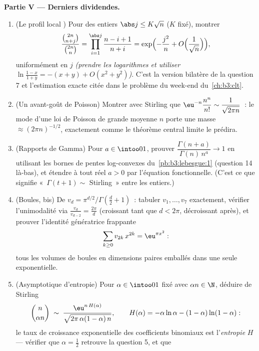 \begin{problem}
\medskip
\noindent\textbf{Partie V --- Derniers dividendes.}
\begin{enumerate}[resume]
  \item (Le profil local ) Pour des entiers $\abs j
        \leq K\sqrt n$ ($K$ fixé), montrer
        \[
        \frac{\binom{2n}{n+j}}{\binom{2n}{n}} =
        \prod_{i=1}^{\abs j}\frac{n - i + 1}{n + i}
        = \exp\Bigl(-\frac{j^2}n +
        O\Bigl(\frac1{\sqrt n}\Bigr)\Bigr),
        \]
        uniformément en $j$ \emph{(prendre les logarithmes et
        utiliser $\ln \frac{1-x}{1+y} = -(x + y) + O(x^2 +
        y^2)$)}. C'est la version bilatère de la question 7
        et l'estimation exacte citée dans le problème du
        week-end du~\cref{ch:b3:clt}.
  \item (Un avant-goût de Poisson) Montrer avec Stirling que
        $\eu^{-n}\dfrac{n^n}{n!} \sim \dfrac1{\sqrt{2\pi
        n}}$~: le mode d'une loi de Poisson de grande
        moyenne $n$ porte une masse $\approx (2\pi
        n)^{-1/2}$, exactement comme le théorème central
        limite le prédira.
  \item (Rapports de Gamma) Pour $a \in \intoo01$, prouver
        $\dfrac{\Gamma(n + a)}{\Gamma(n)\,n^a} \to 1$ en
        utilisant les bornes de pentes log-convexes
        du~\cref{pb:b3:lebesgue:1} (question 14 là-bas), et
        étendre à tout réel $a > 0$ par l'équation
        fonctionnelle. (C'est ce que signifie «~$\Gamma(t+1)
        \sim$ Stirling~» entre les entiers.)
  \item (Boules, bis) De $v_d = \pi^{d/2}/\Gamma(\frac d2 +
        1)$~: tabuler $v_1, \dots, v_7$ exactement, vérifier
        l'unimodalité via $\frac{v_d}{v_{d-2}} =
        \frac{2\pi}d$ (croissant tant que $d < 2\pi$,
        décroissant après), et prouver l'identité
        génératrice frappante
        \[
        \sum_{k\geq0}v_{2k}\,x^{2k} = \eu^{\pi x^2} :
        \]
        tous les volumes de boules en dimensions paires
        emballés dans une seule exponentielle.
  \item (Asymptotique d'entropie) Pour $\alpha \in \intoo01$
        fixé avec $\alpha n \in \N$, déduire de Stirling
        \[
        \binom{n}{\alpha n} \;\sim\;
        \frac{\eu^{n\,H(\alpha)}}
        {\sqrt{2\pi\,\alpha(1-\alpha)\,n}},
        \qquad
        H(\alpha) = -\alpha\ln\alpha -
        (1-\alpha)\ln(1-\alpha) :
        \]
        le taux de croissance exponentielle des coefficients
        binomiaux est l'\emph{entropie} $H$ --- vérifier que
        $\alpha = \frac12$ retrouve la question 5, et que

\end{enumerate}
\end{problem}
